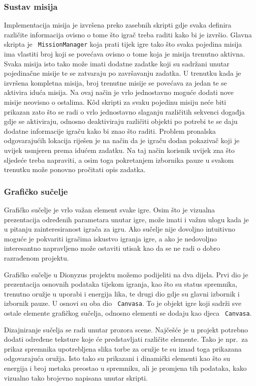  \subsubsection*{Sustav misija}
Implementacija misija je izvršena preko zasebnih skripti gdje svaka definira
različite informacija ovisno o tome što igrač treba raditi kako bi je izvršio.
Glavna skripta je ~\texttt{MissionManager} koja prati tijek igre tako što svaka pojedina
misija ima vlastiti broj koji se povećava ovisno o tome koja je misija trenutno
aktivna. Svaka misija isto tako može imati dodatne zadatke koji su sadržani unutar
pojedinačne misije te se zatvaraju po završavanju zadatka. U trenutku kada je
izvršena kompletna misija, broj trenutne misije se povećava za jedan te se aktivira
iduća misija. Na ovaj način je vrlo jednostavno moguće dodati nove misije neovisno o
ostalima. K\^od skripti za svaku pojedinu misiju neće biti prikazan zato što se radi
o vrlo jednostavno slaganju različitih sekvenci događja gdje se aktiviraju, odnosno
deaktiviraju različiti objekti po potrebi te se daju dodatne informacije igraču kako
bi znao što raditi. Problem pronalska odgovarajućih lokacija riješen je na način da
je igraču dodan pokazivač koji je uvijek usmjeren prema idućem zadatku. Na taj način
korisnik uvijek zna što sljedeće treba napraviti, a osim toga pokretanjem izbornika
pauze u svakom trenutku može ponovno pročitati opis zadatka.

 \subsubsection*{Grafičko sučelje}
Grafičko sučelje je vrlo važan element svake igre. Osim što je vizualna prezentacija
određenih parametara unutar igre, može imati i važnu ulogu kada je u pitanju
zainteresiranost igrača za igru. Ako sučelje nije dovoljno intuitivno moguće je
pokvariti igračima iskustvo igranja igre, a ako je nedovoljno interesantno
napravljeno može ostaviti utisak kao da se ne radi o dobro razrađenom projektu.

Grafičko sučelje u Dionyzus projektu možemo podijeliti na dva dijela. Prvi dio je
prezentacija osnovnih podataka tijekom igranja, kao što su status spremnika,
trenutno oružje u uporabi i energija lika, te drugi dio gdje su glavni izbornik i
izbornik pauze. U osnovi su oba dio ~\texttt{Canvasa}. To je objekt igre koji sadrži sve
ostale elemente grafičkog sučelja, odnosno elementi se dodaju kao djeca ~\texttt{Canvasa}. 

Dizajniranje sučelja se radi unutar prozora scene. Najčešće je u projekt potrebno
dodati određene teksture koje će predstavljati različite elemente. Tako je npr.~za
prikaz spremnika upotrebljena slika torbe za oružje te su iznad toga prikazana
odgovarajuća oružja. Isto tako su prikazani i dinamički elementi kao što su energija
i broj metaka preostao u spremniku, ali je promjena tih podataka, kako vizualno tako
brojevno napisana unutar skripti. 


